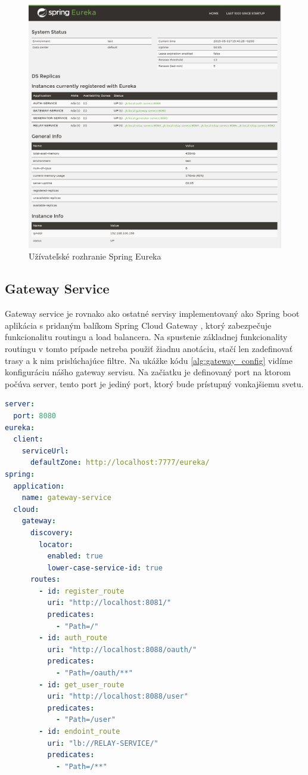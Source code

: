 \begin{figure}[!htbp] 
	\centering 
	\includegraphics[width=16cm]{img/eureka_gui.png} 
	\caption{Užívateľské rozhranie Spring Eureka} 
	\label{eureka_gui} 
\end{figure}


\subsection{Gateway Service}  
Gateway service je rovnako ako ostatné servisy implementovaný ako Spring boot aplikácia s pridaným balíkom Spring Cloud Gateway \cite{cloud_gateway}, ktorý zabezpečuje funkcionalitu routingu a load balancera.  
Na spustenie základnej funkcionality routingu v tomto prípade netreba použiť žiadnu anotáciu, stačí len zadefinovať trasy a k nim prislúchajúce filtre. Na ukážke kódu \ref{alg:gateway_config} vidíme konfiguráciu nášho gateway servisu. Na začiatku je definovaný port na ktorom počúva server, tento port je jediný port, ktorý bude prístupný vonkajšiemu svetu. 


\begin{lstlisting}[float, caption={Konfigurácia Gateway servisu},label={alg:gateway_config},language=yaml]
server:
  port: 8080
eureka:
  client:
    serviceUrl:
      defaultZone: http://localhost:7777/eureka/
spring:
  application:
    name: gateway-service
  cloud:
    gateway:
      discovery:
        locator:
          enabled: true
          lower-case-service-id: true
      routes:
        - id: register_route
          uri: "http://localhost:8081/"
          predicates:
            - "Path=/"
        - id: auth_route
          uri: "http://localhost:8088/oauth/"
          predicates:
            - "Path=/oauth/**"
        - id: get_user_route
          uri: "http://localhost:8088/user"
          predicates:
            - "Path=/user"
        - id: endoint_route
          uri: "lb://RELAY-SERVICE/"
          predicates:
            - "Path=/**"
\end{lstlisting} 

